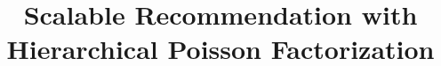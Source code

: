 \documentclass{sig-alternate}
\begin{document}
%

\title{Scalable Recommendation with Hierarchical Poisson Factorization}

%
%
%
%
%

\end{document}
